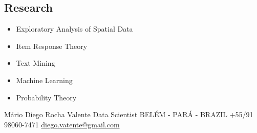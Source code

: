 \documentclass[lighthipster]{simplehipstercv}
\newlength{\rightcolwidth}
\begin{document}
\begin{paracol}{2}
\begin{minipage}[t]{0.3\textwidth}
\vspace{3em}
\end{minipage}



\section*{Research}
\begin{itemize}
    \item Exploratory Analysis of Spatial Data
    \item Item Response Theory
    \item Text Mining
    \item Machine Learning
    \item Probability Theory
\end{itemize}

\vfill{} %

\setlength{\parindent}{0pt}
\begin{minipage}[t]{\rightcolwidth}
\begin{center}\fontfamily{\sfdefault}\selectfont \color{black!70}
{\small Mário Diego Rocha Valente  Data Scientist  BELÉM - PARÁ - BRAZIL  \newline {}  +55/91 98060-7471  \protect\url{diego.vatente@gmail.com}
}
\end{center}
\end{minipage}
\end{paracol}
\end{document}
